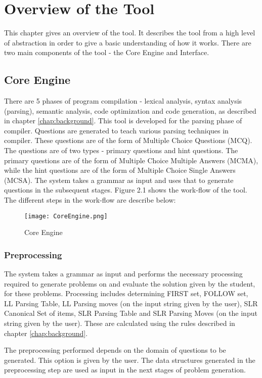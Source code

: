 \chapter{Overview of the Tool}
\label{chap:overview}
This chapter gives an overview of the tool. It describes the tool from a high level of abstraction in order to give a basic understanding of how it works. There are two main components of the tool - the Core Engine and Interface.

\section{Core Engine}
\label{sec:core engine}
There are 5 phases of program compilation - lexical analysis, syntax analysis (parsing), semantic analysis, code optimization and code generation, as described in chapter \ref{chap:background}. This tool is developed for the parsing phase of compiler. Questions are generated to teach various parsing techniques in compiler. These questions are of the form of Multiple Choice Questions (MCQ). The questions are of two types - primary questions and hint questions. The primary questions are of the form of Multiple Choice Multiple Answers (MCMA), while the hint questions are of the form of Multiple Choice Single Answers (MCSA). The system takes a grammar as input and uses that to generate questions in the subsequent stages. Figure 2.1 shows the work-flow of the tool. The different steps in the work-flow are describe below:
\begin{figure}
\centering
\texttt{[image: CoreEngine.png]}
\caption{Core Engine}
\label{fig:core engine}
\end{figure}

\subsection{Preprocessing}
\label{subsec:preprocessing}
The system takes a grammar as input and performs the necessary processing required to generate problems on and evaluate the solution given by the student, for these problems. Processing includes determining FIRST set, FOLLOW set, LL Parsing Table, LL Parsing moves (on the input string given by the user), SLR Canonical Set of items, SLR Parsing Table and SLR Parsing Moves (on the input string given by the user). These are calculated using the rules described in chapter \ref{chap:background}.

The preprocessing performed depends on the domain of questions to be generated. This option is given by the user. The data structures generated in the preprocessing step are used as input in the next stages of problem generation.

